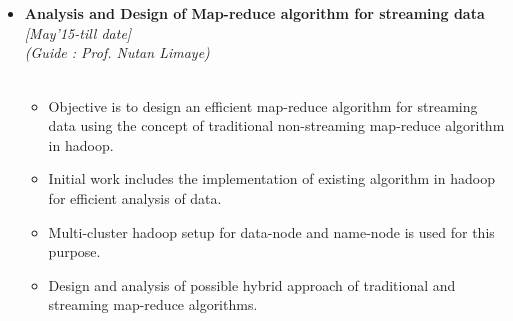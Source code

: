 \\[-.7cm]\\
\begin{itemize}
	\item \textbf{Analysis and Design of Map-reduce algorithm for streaming data} \hfill {\emph{[May'15-till date]}} \\[-0.05cm] 
	\emph{(Guide : Prof. Nutan Limaye)} \hfill \\[-1.1 cm]\\
	\begin{itemize}
		\item Objective is to design an efficient map-reduce algorithm for streaming data using the concept of traditional non-streaming map-reduce algorithm in hadoop.
		\item Initial work includes the implementation of existing algorithm in hadoop for efficient analysis of data.
		\item Multi-cluster hadoop setup for data-node and name-node is used for this purpose.
		\item Design and analysis of possible hybrid approach of traditional and streaming map-reduce algorithms.\\[-0.8cm]\\
	\end{itemize}
\end{itemize}

